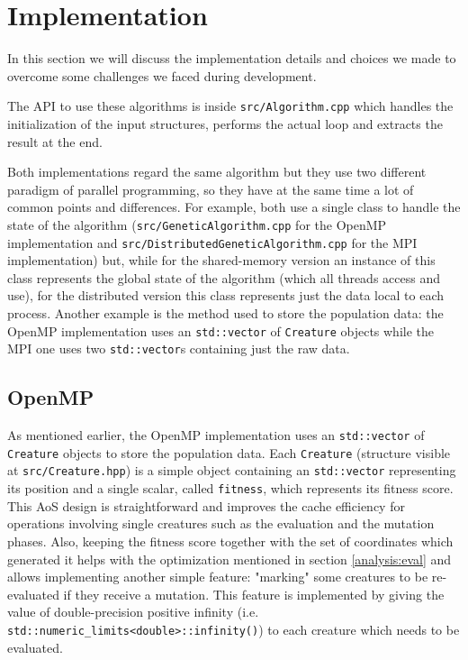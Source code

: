 \documentclass[12pt,a4paper,oneside]{article}
\begin{document}
	\clearpage
	\section{Implementation}
	In this section we will discuss the implementation details and choices we made to overcome some challenges we faced during development.

	The API to use these algorithms is inside \texttt{src/Algorithm.cpp} which handles the initialization of the input structures, performs the actual loop and extracts the result at the end.

	Both implementations regard the same algorithm but they use two different paradigm of parallel programming, so they have at the same time a lot of common points and differences.
	For example, both use a single class to handle the state of the algorithm (\texttt{src/GeneticAlgorithm.cpp} for the OpenMP implementation and \texttt{src/DistributedGeneticAlgorithm.cpp} for the MPI implementation) but, while for the shared-memory version an instance of this class represents the global state of the algorithm (which all threads access and use), for the distributed version this class represents just the data local to each process.
	Another example is the method used to store the population data: the OpenMP implementation uses an \texttt{std::vector} of \texttt{Creature} objects while the MPI one uses two \texttt{std::vector}s containing just the raw data.

	\subsection{OpenMP}
	As mentioned earlier, the OpenMP implementation uses an \texttt{std::vector} of \texttt{Creature} objects to store the population data.
	Each \texttt{Creature} (structure visible at \texttt{src/Creature.hpp}) is a simple object containing an \texttt{std::vector} representing its position and a single scalar, called \texttt{fitness}, which represents its fitness score.
	This AoS design is straightforward and improves the cache efficiency for operations involving single creatures such as the evaluation and the mutation phases.
	Also, keeping the fitness score together with the set of coordinates which generated it helps with the optimization mentioned in section \ref{analysis:eval} and allows implementing another simple feature: "marking" some creatures to be re-evaluated if they receive a mutation.
	This feature is implemented by giving the value of double-precision positive infinity (i.e. \texttt{std::numeric\_limits<double>::infinity()}) to each creature which needs to be evaluated.
\end{document}
